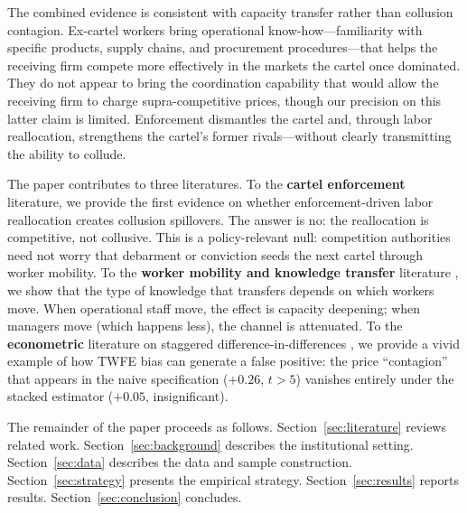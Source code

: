 The combined evidence is consistent with capacity transfer rather than collusion contagion. Ex-cartel workers bring operational know-how---familiarity with specific products, supply chains, and procurement procedures---that helps the receiving firm compete more effectively in the markets the cartel once dominated. They do not appear to bring the coordination capability that would allow the receiving firm to charge supra-competitive prices, though our precision on this latter claim is limited. Enforcement dismantles the cartel and, through labor reallocation, strengthens the cartel's former rivals---without clearly transmitting the ability to collude.

The paper contributes to three literatures. To the \textbf{cartel enforcement} literature, we provide the first evidence on whether enforcement-driven labor reallocation creates collusion spillovers. The answer is no: the reallocation is competitive, not collusive. This is a policy-relevant null: competition authorities need not worry that debarment or conviction seeds the next cartel through worker mobility. To the \textbf{worker mobility and knowledge transfer} literature \citep{stoyanov2012worker, serafinelli2019good, jarosch2021learning}, we show that the type of knowledge that transfers depends on which workers move. When operational staff move, the effect is capacity deepening; when managers move (which happens less), the channel is attenuated. To the \textbf{econometric} literature on staggered difference-in-differences \citep{goodman2021difference, cengiz2019effect}, we provide a vivid example of how TWFE bias can generate a false positive: the price ``contagion'' that appears in the naive specification ($+0.26$, $t > 5$) vanishes entirely under the stacked estimator ($+0.05$, insignificant).

The remainder of the paper proceeds as follows. Section~\ref{sec:literature} reviews related work. Section~\ref{sec:background} describes the institutional setting. Section~\ref{sec:data} describes the data and sample construction. Section~\ref{sec:strategy} presents the empirical strategy. Section~\ref{sec:results} reports results. Section~\ref{sec:conclusion} concludes.
